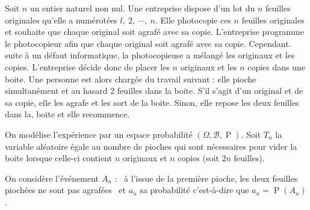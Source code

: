 \documentclass[11pt]{article}%
\begin{document}
Soit $n$ un entier naturel non nul. Une entreprise dispose d'un lot du
$n$
feuilles originales qu'elle a numérotées $l,\ 2,\ \cdots,\ n.$ Elle
photocopie ces $n$ feuilles originales et souhaite que chaque original
soit
agrafé avec sa copie. L'entreprise programme le photocopieur afin que
chaque original soit agrafé avec sa copie. Cependant. suite à un défaut
informatique, la photocopieuse a mélangé les originaux et
les copies. L'entreprise décide donc de placer les $n$ originaux et les
$n$ copies dans une boite. Une personne est alors chargée du travail
suivant : elle pioche simultanément et au hasard 2 feuilles dans la
boite. S'il s'agit d'un original et de sa copie, elle les agrafe et les
sort
de la boite. Sinon, elle repose les deux feuilles dans la, boite et
elle
recommence.

On modélise l'expérience par un espace probabilité $\left(
\Omega,\mathcal{B},\operatorname{P}\right) $. Soit $T_{n}$ la variable
aléatoire égale au nombre de pioches qui sont nécessaires pour vider la
boite lorsque celle-ci contient $n$ originaux et $n$ copies (soit $2n$
feuilles).

On considère l'événement $A_{n}$ : \guillemotleft\ à l'issue
de la première pioche, les deux feuilles piochées ne sont pas agrafées
\guillemotright\ et $a_{n}$ sa probabilité c'est-à-dire que $a_{n} =
\operatorname{P}\left( A_{n}\right) $.
\end{document}
